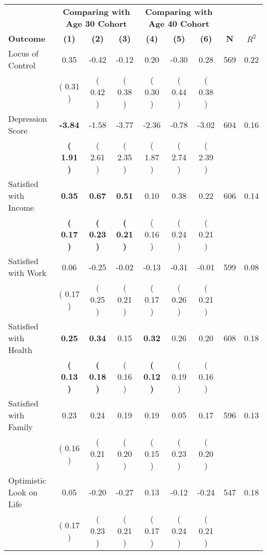 \begin{tabular}{lcccccccc}
\toprule
 & \multicolumn{3}{c}{\textbf{Comparing with Age 30 Cohort}} & \multicolumn{3}{c}{\textbf{Comparing with Age 40 Cohort}} & \\
\cmidrule(lr){2-4} \cmidrule(lr){5-7} 
 \textbf{Outcome} & \textbf{(1)} & \textbf{(2)} & \textbf{(3)} & \textbf{(4)} & \textbf{(5)} & \textbf{(6)} & \textbf{N} & \textbf{$ R^2$} \\
\midrule
Locus of Control &      0.35 &     -0.42 &     -0.12 &      0.20 &     -0.30 &      0.28 & 569 &       0.22 \\ 
 & (     0.31 ) & (     0.42 ) & (     0.38 ) & (     0.30 ) & (     0.44 ) & (     0.38 ) & \\
Depression Score & \textbf{    -3.84} &     -1.58 &     -3.77 &     -2.36 &     -0.78 &     -3.02 & 604 &       0.16 \\ 
 & \textbf{(     1.91 )} & (     2.61 ) & (     2.35 ) & (     1.87 ) & (     2.74 ) & (     2.39 ) & \\
Satisfied with Income & \textbf{     0.35} & \textbf{     0.67} & \textbf{     0.51} &      0.10 &      0.38 &      0.22 & 606 &       0.14 \\ 
 & \textbf{(     0.17 )} & \textbf{(     0.23 )} & \textbf{(     0.21 )} & (     0.16 ) & (     0.24 ) & (     0.21 ) & \\
Satisfied with Work &      0.06 &     -0.25 &     -0.02 &     -0.13 &     -0.31 &     -0.01 & 599 &       0.08 \\ 
 & (     0.17 ) & (     0.25 ) & (     0.21 ) & (     0.17 ) & (     0.26 ) & (     0.21 ) & \\
Satisfied with Health & \textbf{     0.25} & \textbf{     0.34} &      0.15 & \textbf{     0.32} &      0.26 &      0.20 & 608 &       0.18 \\ 
 & \textbf{(     0.13 )} & \textbf{(     0.18 )} & (     0.16 ) & \textbf{(     0.12 )} & (     0.19 ) & (     0.16 ) & \\
Satisfied with Family &      0.23 &      0.24 &      0.19 &      0.19 &      0.05 &      0.17 & 596 &       0.13 \\ 
 & (     0.16 ) & (     0.21 ) & (     0.20 ) & (     0.15 ) & (     0.23 ) & (     0.20 ) & \\
Optimistic Look on Life &      0.05 &     -0.20 &     -0.27 &      0.13 &     -0.12 &     -0.24 & 547 &       0.18 \\ 
 & (     0.17 ) & (     0.23 ) & (     0.21 ) & (     0.17 ) & (     0.24 ) & (     0.21 ) & \\

\end{tabular}
